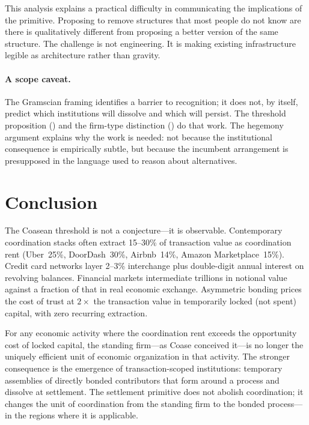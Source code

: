 \documentclass[11pt,a4paper]{article}
\theoremstyle{definition}
\theoremstyle{remark}
\begin{document}
This analysis explains a practical difficulty in communicating the
implications of the primitive. Proposing to remove structures that
most people do not know are there is qualitatively different from
proposing a better version of the same structure. The challenge is
not engineering. It is making existing infrastructure legible as
architecture rather than gravity.

\paragraph{A scope caveat.}
The Gramscian framing identifies a barrier to recognition; it does
not, by itself, predict which institutions will dissolve and which
will persist. The threshold proposition ()
and the firm-type distinction () do that work.
The hegemony argument explains why the work is needed: not because
the institutional consequence is empirically subtle, but because the
incumbent arrangement is presupposed in the language used to reason
about alternatives.

\section{Conclusion}
\label{sec:conclusion}

The Coasean threshold is not a conjecture---it is observable.
Contemporary coordination stacks often extract 15--30\% of transaction
value as coordination rent (Uber~25\%, DoorDash~30\%, Airbnb~14\%,
Amazon Marketplace~15\%). Credit card networks layer 2--3\%
interchange plus double-digit annual interest on revolving balances.
Financial markets intermediate trillions in notional value against a
fraction of that in real economic exchange. Asymmetric bonding prices
the cost of trust at $2\times$ the transaction value in temporarily
locked (not spent) capital, with zero recurring extraction.

For any economic activity where the coordination rent exceeds the
opportunity cost of locked capital, the standing firm---as Coase
conceived it---is no longer the uniquely efficient unit of economic
organization in that activity. The stronger consequence is the
emergence of transaction-scoped institutions: temporary assemblies of
directly bonded contributors that form around a process and dissolve
at settlement. The settlement primitive does not abolish coordination;
it changes the unit of coordination from the standing firm to the
bonded process---in the regions where it is applicable.
\end{document}
